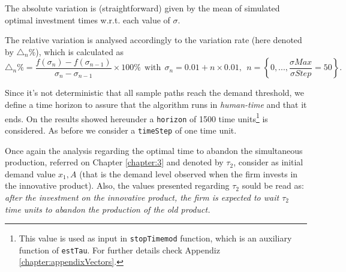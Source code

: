 The absolute variation is (straightforward) given by the mean of simulated optimal investment times w.r.t. each value of $\sigma$.

The relative variation is analysed accordingly to the variation rate (here denoted by $\triangle_n \% $), which is calculated as
\begin{equation}
\triangle_n \% = \frac{f(\sigma_n)-f(\sigma_{n-1})}{\sigma_n-\sigma_{n-1}} \times 100 \% \  \ \text{with} \ \ \sigma_n=0.01+n\times0.01, \ \ n=\left\lbrace 0,..., \frac{\sigma Max}{\sigma Step}=50 \right\rbrace.
\label{var}
\end{equation}

Since it's not deterministic that all sample paths reach the demand threshold, we define a time horizon to assure that the algorithm runs in \textit{human-time} and that it ends. On the results showed hereunder a \texttt{horizon} of 1500 time units\footnote{This value is used as input in \texttt{stopTimemod} function, which is an auxiliary function of \texttt{estTau}. For further details check Appendiz \ref{chapter:appendixVectors}.} is considered. As before we consider a \texttt{timeStep} of one time unit.

Once again the analysis regarding the optimal time to abandon the simultaneous production, referred on Chapter \ref{chapter:3} and denoted by $\tau_2$, consider as initial demand value $x_1,A$ (that is the demand level observed when the firm invests in the innovative product). Also, the values presented regarding $\tau_2$ sould be read as: \textit{after the investment on the innovative product, the firm is expected to wait $\tau_2$ time units to abandon the production of the old product.}




